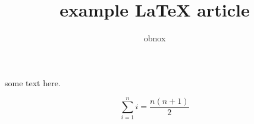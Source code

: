 \documentclass{article}
\title{example {\LaTeX} article}
\author{obnox}
\begin{document}
\maketitle

some text here.

\[ \sum_{i=1}^{n}i = \frac{n(n+1)}{2} \]
\end{document}
